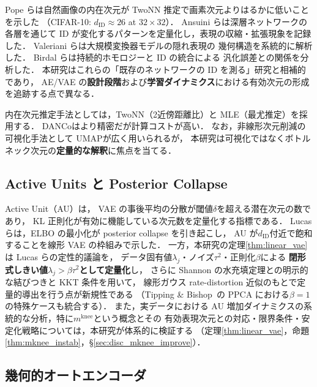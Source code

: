 \documentclass[11pt,a4paper]{jsarticle}
\newcommand{\mknee}{m^{\mathrm{knee}}}
\begin{document}
Pope ら\cite{pope2021intrinsic}は自然画像の内在次元が
TwoNN 推定で画素次元よりはるかに低いことを示した
（CIFAR-10: $d_\mathrm{ID} \approx 26$ at $32 \times 32$）．
Ansuini ら\cite{ansuini2019intrinsic}は深層ネットワークの各層を通じて
ID が変化するパターンを定量化し，表現の収縮・拡張現象を記録した．
Valeriani ら\cite{valeriani2023geometry}は大規模変換器モデルの隠れ表現の
幾何構造を系統的に解析した．
Birdal ら\cite{birdal2021intrinsic}は持続的ホモロジーと ID の統合による
汎化誤差との関係を分析した．
本研究はこれらの「既存のネットワークの ID を測る」研究と相補的であり，
AE/VAE の\textbf{設計段階}および\textbf{学習ダイナミクス}における有効次元の形成を追跡する点で異なる．

内在次元推定手法としては，TwoNN\cite{facco2017twonn}（2近傍距離比）と
MLE\cite{levina2005mle}（最尤推定）を採用する．
DANCo\cite{ceruti2014danco}はより精密だが計算コストが高い．
なお，非線形次元削減の可視化手法として UMAP\cite{mcinnes2018umap}が広く用いられるが，
本研究は可視化ではなくボトルネック次元の\textbf{定量的な解釈}に焦点を当てる．

\subsection{Active Units と Posterior Collapse}\label{sec:related_au}

Active Unit（AU）\cite{lucas2019elbo,higgins2017betavae}は，
VAE の事後平均の分散が閾値$\delta$を超える潜在次元の数であり，
KL 正則化が有効に機能している次元数を定量化する指標である．
Lucas ら\cite{lucas2019elbo}は，ELBO の最小化が posterior collapse を引き起こし，
AU が$d_{\mathrm{ID}}$付近で飽和することを線形 VAE の枠組みで示した．
一方，本研究の定理\ref{thm:linear_vae}は Lucas らの定性的議論を，
データ固有値$\lambda_j$・ノイズ$\tau^2$・正則化$\beta$による
\textbf{閉形式しきい値$\lambda_j > \beta\tau^2$として定量化}し，
さらに Shannon の水充填定理との明示的な結びつきと KKT 条件を用いて，
線形ガウス rate-distortion 近似のもとで定量的導出を行う点が新規性である
（Tipping \& Bishop~\cite{tippingbishop1999ppca}の PPCA における$\beta=1$の特殊ケースも統合する）．
また，実データにおける AU 増加ダイナミクスの系統的な分析，特に$\mknee$という概念とその
有効表現次元との対応・限界条件・安定化戦略については，本研究が体系的に検証する
（定理\ref{thm:linear_vae}，命題\ref{thm:mknee_instab}，§\ref{sec:disc_mknee_improve}）．

\subsection{幾何的オートエンコーダ}\label{sec:related_geo}
\end{document}
